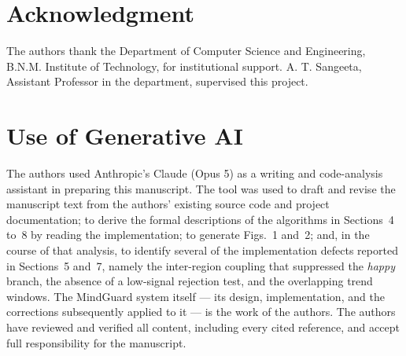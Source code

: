 \documentclass[conference]{IEEEtran}
\begin{document}
\section*{Acknowledgment}

The authors thank the Department of Computer Science and Engineering,
B.N.M. Institute of Technology, for institutional support. A. T. Sangeeta,
Assistant Professor in the department, supervised this project.

\section*{Use of Generative AI}
The authors used Anthropic's Claude (Opus 5) as a writing and code-analysis
assistant in preparing this manuscript. The tool was used to draft and revise
the manuscript text from the authors' existing source code and project
documentation; to derive the formal descriptions of the algorithms in
Sections~4 to~8 by reading the implementation; to generate Figs.~1 and~2; and,
in the course of that analysis, to identify several of the implementation
defects reported in Sections~5 and~7, namely the inter-region coupling that
suppressed the \textit{happy} branch, the absence of a low-signal rejection
test, and the overlapping trend windows. The MindGuard system itself --- its
design, implementation, and the corrections subsequently applied to it --- is
the work of the authors. The authors have reviewed and verified all content,
including every cited reference, and accept full responsibility for the
manuscript.
\end{document}
